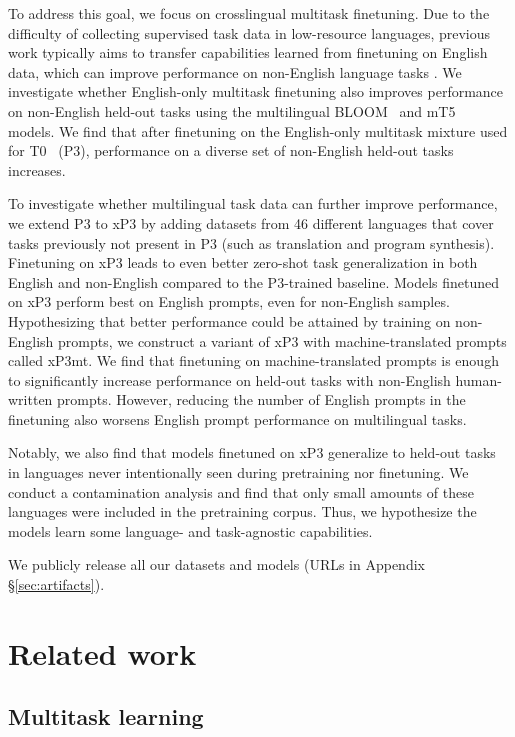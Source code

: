 \documentclass[11pt]{article}
\begin{document}
To address this goal, we focus on crosslingual multitask finetuning. Due to the difficulty of collecting supervised task data in low-resource languages, previous work typically aims to transfer capabilities learned from finetuning on English data, which can improve performance on non-English language tasks \cite{wu-dredze-2019-beto,phang2020english,chalkidis2021multieurlex,vu2022overcoming}. We investigate whether English-only multitask finetuning also improves performance on non-English held-out tasks using the multilingual BLOOM~\cite{scao2022bloom} and mT5~\cite{xue2020mt5} models. We find that after finetuning on the English-only multitask mixture used for T0~\cite{sanh2022multitask} (P3), performance on a diverse set of non-English held-out tasks increases.

To investigate whether multilingual task data can further improve performance, we extend P3 to xP3 by adding datasets from 46 different languages that cover tasks previously not present in P3 (such as translation and program synthesis). Finetuning on xP3 leads to even better zero-shot task generalization in both English and non-English compared to the P3-trained baseline. Models finetuned on xP3 perform best on English prompts, even for non-English samples. Hypothesizing that better performance could be attained by training on non-English prompts, we construct a variant of xP3 with machine-translated prompts called xP3mt. We find that finetuning on machine-translated prompts is enough to significantly increase performance on held-out tasks with non-English human-written prompts. However, reducing the number of English prompts in the finetuning also worsens English prompt performance on multilingual tasks. 

Notably, we also find that models finetuned on xP3 generalize to held-out tasks in languages never intentionally seen during pretraining nor finetuning. We conduct a contamination analysis and find that only small amounts of these languages were included in the pretraining corpus. Thus, we hypothesize the models learn some language- and task-agnostic capabilities.

We publicly release all our datasets and models (URLs in Appendix \S\ref{sec:artifacts}).

\section{Related work}

\subsection{Multitask learning}
\end{document}
